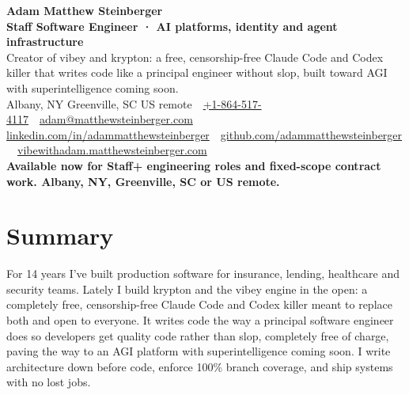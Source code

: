 \documentclass[10pt,letterpaper]{article}
\newcommand{\szname}{\fontsize{20pt}{24pt}\selectfont}
\newcommand{\sztitle}{\fontsize{10.5pt}{13pt}\selectfont}
\newcommand{\szbody}{\fontsize{9pt}{10.8pt}\selectfont}
\newcommand{\szmeta}{\fontsize{8pt}{10pt}\selectfont}
\begin{document}
\color{ink}\szbody

\begin{center}
{\szname\bfseries\color{primary} Adam Matthew Steinberger}\\[3pt]
{\sztitle\bfseries\color{accent} Staff Software Engineer · AI platforms, identity and agent infrastructure}\\[4pt]
{\szbody Creator of vibey and krypton: a free, censorship-free Claude Code and Codex killer that writes code like a principal engineer without slop, built toward AGI with superintelligence coming soon.}\\[6pt]
{\szmeta\color{muted} Albany, NY \textbullet{} Greenville, SC \textbullet{} US remote\ {\color{rulecolor}\textbar}\ \href{tel:+18645174117}{+1-864-517-4117}\ {\color{rulecolor}\textbar}\ \href{mailto:adam@matthewsteinberger.com}{adam@matthewsteinberger.com}}\\[2pt]
{\szmeta\color{muted} \href{https://www.linkedin.com/in/adammatthewsteinberger/}{linkedin.com/in/adammatthewsteinberger}\ {\color{rulecolor}\textbar}\ \href{https://github.com/adammatthewsteinberger}{github.com/adammatthewsteinberger}\ {\color{rulecolor}\textbar}\ \href{https://vibewithadam.matthewsteinberger.com}{vibewithadam.matthewsteinberger.com}}\\[6pt]
{\szbody\bfseries Available now for Staff+ engineering roles and fixed-scope contract work. Albany, NY, Greenville, SC or US remote.}
\end{center}
\vspace{-6pt}
\section*{Summary}
For 14 years I've built production software for insurance, lending, healthcare and security teams. Lately I build krypton and the vibey engine in the open: a completely free, censorship-free Claude Code and Codex killer meant to replace both and open to everyone. It writes code the way a principal software engineer does so developers get quality code rather than slop, completely free of charge, paving the way to an AGI platform with superintelligence coming soon. I write architecture down before code, enforce 100\% branch coverage, and ship systems with no lost jobs.\par
\end{document}
